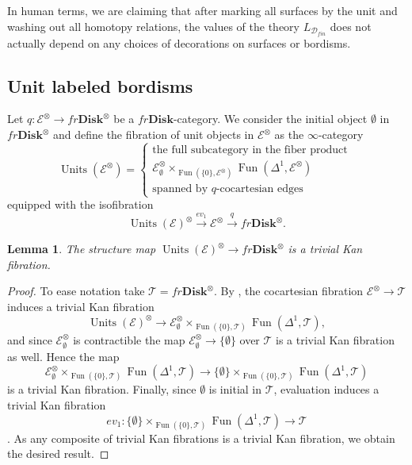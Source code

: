 \documentclass[reqno]{amsart}
\newtheorem{lemma}{Lemma}[section]
\theoremstyle{definition}
\newcommand{\msc}[1]{\mathscr{#1}}
\newcommand{\opn}[1]{\operatorname{#1}}
\newcommand{\ot}{\otimes}
\newcommand{\Disk}{\mathbf{Disk}}
\DeclareMathOperator{\Fun}{Fun}
\renewcommand{\1}{\mathbf{1}}
\begin{document}
In human terms, we are claiming that after marking all surfaces by the unit and washing out all homotopy relations, the values of the theory $L_{\msc{D}_{fin}}$ does not actually depend on any choices of decorations on surfaces or bordisms.

\subsection{Unit labeled bordisms}

Let $q:\msc{E}^{\ot}\to fr\Disk^{\ot}$ be a $fr\Disk$-category. We consider the initial object $\emptyset$ in $fr\Disk^{\ot}$ and define the fibration of unit objects in $\msc{E}^{\ot}$ as the $\infty$-category
\[
\opn{Units}(\msc{E}^{\otimes})=\left\{\begin{array}{c}
\text{the full subcategory in the fiber product }\\
\msc{E}^{\otimes}_{\emptyset}\times_{\Fun(\{0\},\msc{E}^{\ot})}\Fun(\Delta^1,\msc{E}^{\ot})\\
\text{spanned by $q$-cocartesian edges}
\end{array}\right.
\]
equipped with the isofibration
\[
\opn{Units}(\msc{E})^{\ot}\overset{ev_1}\longrightarrow \msc{E}^{\ot}\overset{q}\to fr\Disk^{\ot}.
\]

\begin{lemma}\label{lem:4866}
The structure map $\opn{Units}(\msc{E})^{\ot}\to fr\Disk^{\ot}$ is a trivial Kan fibration.
\end{lemma}

\begin{proof}
To ease notation take $\msc{T}=fr\Disk^{\ot}$. By \cite[\href{https://kerodon.net/tag/01VK}{01VK}]{kerodon}, the cocartesian fibration $\msc{E}^{\ot}\to \msc{T}$ induces a trivial Kan fibration
\[
\opn{Units}(\msc{E})^{\ot}\to \msc{E}_{\emptyset}^{\ot}\times_{\Fun(\{0\},\msc{T})}\Fun(\Delta^1,\msc{T}),
\]
and since $\msc{E}^{\ot}_{\emptyset}$ is contractible the map $\msc{E}^{\ot}_{\emptyset}\to \{\emptyset\}$ over $\msc{T}$ is a trivial Kan fibration as well. Hence the map
\[
\msc{E}_{\emptyset}^{\ot}\times_{\Fun(\{0\},\msc{T})}\Fun(\Delta^1,\msc{T})\to \{\emptyset\}\times_{\Fun(\{0\},\msc{T})}\Fun(\Delta^1,\msc{T})
\]
is a trivial Kan fibration. Finally, since $\emptyset$ is initial in $\msc{T}$, evaluation induces a trivial Kan fibration
\[
ev_1:\{\emptyset\}\times_{\Fun(\{0\},\msc{T})}\Fun(\Delta^1,\msc{T})\to \msc{T}
\]
\cite[\href{https://kerodon.net/tag/06R2}{06R2}, \href{https://kerodon.net/tag/01KU}{01KU}]{kerodon}. As any composite of trivial Kan fibrations is a trivial Kan fibration, we obtain the desired result.
\end{proof}
\end{document}
